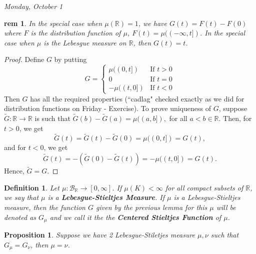 \documentclass[letterpaper, 12pt]{article}
\newcommand{\fin}{\qquad \quad \hfill \framebox[1.75mm][l]{\,}}
\newcommand{\cB}{\mathcal{B}}
\newcommand{\bR}{\mathbb{R}}
\theoremstyle{stdthm}
\newtheorem{prop}[thm]{Proposition}
\theoremstyle{stddef}
\newtheorem{defn}[thm]{Definition}
\newtheorem{rem}[thm]{rem} %
\theoremstyle{stdnonum}
\theoremstyle{stdqands}
\theoremstyle{stdbold}
\begin{document}
\emph{Monday, October 1}

\begin{rem}
In the special case when $\mu(\bR) = 1$, we have $G(t) = F(t) - F(0)$ where $F$ is the distribution function of $\mu$, $F(t) = \mu((-\infty, t])$. In the special case when $\mu$ is the Lebesgue measure on $\bR$, then $G(t) = t$. 
\end{rem}


\begin{proof}
Define $G$ by putting
\[ G = 
\begin{cases}
\mu((0,t]) &\text{If } t>0\\
0 &\text{If } t=0\\
-\mu((t,0]) &\text{If } t<0 
\end{cases}
\]
Then $G$ has all the required properties (``cadlag" checked exactly as we did for distribution functions on Friday - Exercise). To prove uniqueness of $G$, suppose $\tilde{G}: \bR \rightarrow \bR$ is such that $\tilde{G}(b) - \tilde{G}(a) = \mu((a,b]),$ for all $a<b \in \bR$. Then, for $t>0$, we get 
\[
\tilde{G}(t) =\tilde{G}(t) - \tilde{G}(0) = \mu((0,t]) = G(t),
\] 
and for $t<0$, we get 
\[
\tilde{G}(t) = -(\tilde{G}(0) - \tilde{G}(t)) = -\mu((t,0]) = G(t).\]
Hence, $\tilde{G} = G$. 
\end{proof}

\begin{defn}
Let $\mu: \cB_\bR \rightarrow [0,\infty]$. If $\mu(K)<\infty$ for all compact subsets of $\bR$, we say that $\mu$ is a {\bf Lebesgue-Stieltjes Measure}.  If $\mu$ is a Lebesgue-Stieltjes measure, then the function $G$ given by the previous lemma for this $\mu$ will be denoted as $G_\mu$ and we call it the the {\bf Centered Stieltjes Function} of $\mu$. 
\end{defn}

\begin{prop}
Suppose we have 2 Lebesgue-Stiletjes measure $\mu, \nu$ such that $G_\mu = G_\nu$, then $\mu = \nu$. 
\end{prop}
\end{document}
